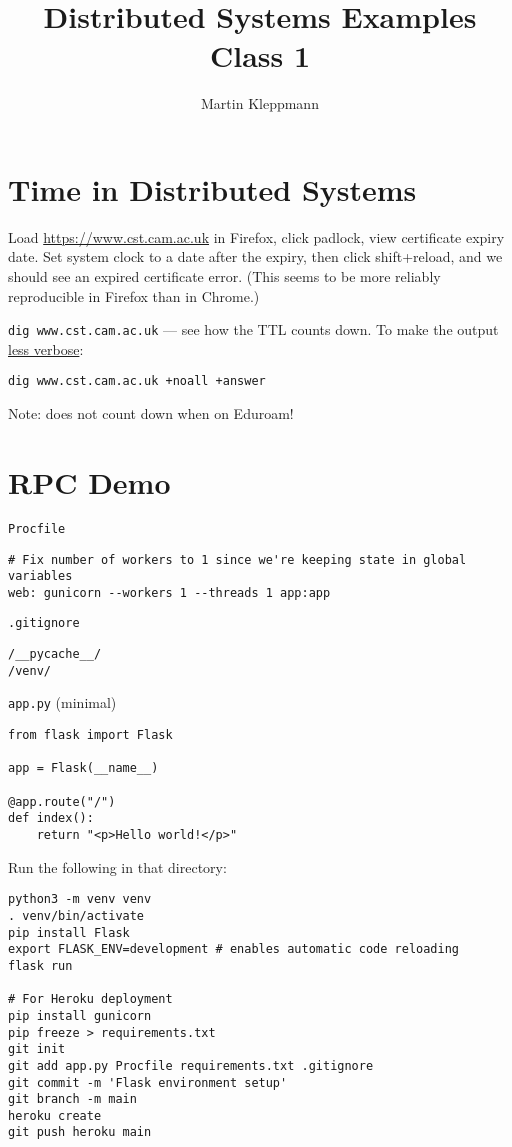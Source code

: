 \documentclass{article}
\begin{document}
\title{Distributed Systems Examples Class 1}
\author{Martin Kleppmann}
\date{}
\maketitle

\section{Time in Distributed Systems}

Load \url{https://www.cst.cam.ac.uk} in Firefox, click padlock, view certificate expiry date.
Set system clock to a date after the expiry, then click shift+reload, and we should see an expired certificate error.
(This seems to be more reliably reproducible in Firefox than in Chrome.)

\texttt{dig www.cst.cam.ac.uk} --- see how the TTL counts down. To make the output \href{https://jvns.ca/blog/2021/12/04/how-to-use-dig/}{less verbose}:
\begin{verbatim}
dig www.cst.cam.ac.uk +noall +answer
\end{verbatim}
Note: does not count down when on Eduroam!

\section{RPC Demo}

\texttt{Procfile}
\begin{verbatim}
# Fix number of workers to 1 since we're keeping state in global variables
web: gunicorn --workers 1 --threads 1 app:app
\end{verbatim}

\texttt{.gitignore}
\begin{verbatim}
/__pycache__/
/venv/
\end{verbatim}

\texttt{app.py} (minimal)
\begin{verbatim}
from flask import Flask

app = Flask(__name__)

@app.route("/")
def index():
    return "<p>Hello world!</p>"
\end{verbatim}

Run the following in that directory:

\begin{verbatim}
python3 -m venv venv
. venv/bin/activate
pip install Flask
export FLASK_ENV=development # enables automatic code reloading
flask run

# For Heroku deployment
pip install gunicorn
pip freeze > requirements.txt
git init
git add app.py Procfile requirements.txt .gitignore
git commit -m 'Flask environment setup'
git branch -m main
heroku create
git push heroku main
\end{verbatim}
\end{document}
